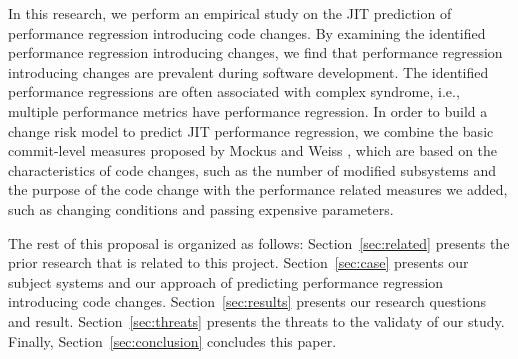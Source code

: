 In this research, we perform an empirical study on the JIT prediction of performance regression introducing code changes. 
By examining the identified performance regression introducing changes, we find that performance regression introducing changes are prevalent during software development. The identified performance regressions are often associated with complex syndrome, i.e., multiple performance metrics have performance regression. In order to build a change risk model to predict JIT performance regression, we combine the basic commit-level measures proposed by Mockus and Weiss \cite{mockus2000predicting}, which are based on the characteristics of code changes, such as the number of modified subsystems and the purpose of the code change with the performance related measures we added, such as changing conditions and passing expensive parameters.



The rest of this proposal is organized as follows: Section~\ref{sec:related} presents the prior research that is related to this project. Section~\ref{sec:case} presents our subject systems and our approach of predicting performance regression introducing code changes. Section~\ref{sec:results} presents our research questions and result. Section~\ref{sec:threats} presents the threats to the validaty of our study. Finally, Section~\ref{sec:conclusion} concludes this paper.

